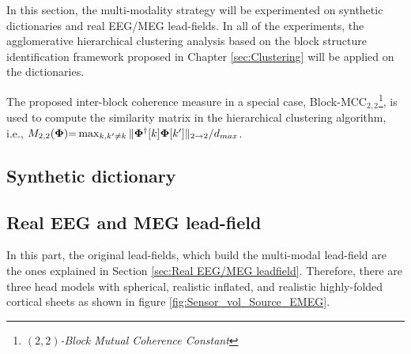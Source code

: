 In this section, the multi-modality strategy will be experimented on synthetic dictionaries and real EEG/MEG lead-fields.
In all of the experiments, the agglomerative hierarchical clustering analysis based on the block structure identification framework proposed in Chapter \ref{sec:Clustering} will be applied on the dictionaries.

The proposed inter-block coherence measure in a special case, Block-MCC$_{2,2}$\footnote{\emph{$({2,2})$-Block Mutual Coherence Constant}}, is used to compute the similarity matrix in the hierarchical clustering algorithm, i.e., $M_{2,2}(\boldsymbol{\Phi}) {=} \max_{k,k' \neq k} \Vert \boldsymbol{\Phi}^\dagger[k] \boldsymbol{\Phi} [k'] \Vert_{2 {\to} 2} /d_{max} $.
\subsection{Synthetic dictionary}

\subsection{Real EEG and MEG lead-field}
In this part, the original lead-fields, which build the multi-modal lead-field are the ones explained in Section \ref{sec:Real EEG/MEG leadfield}.
Therefore, there are three head models with spherical, realistic inflated, and realistic highly-folded cortical sheets as shown in figure \ref{fig:Sensor_vol_Source_EMEG}.

